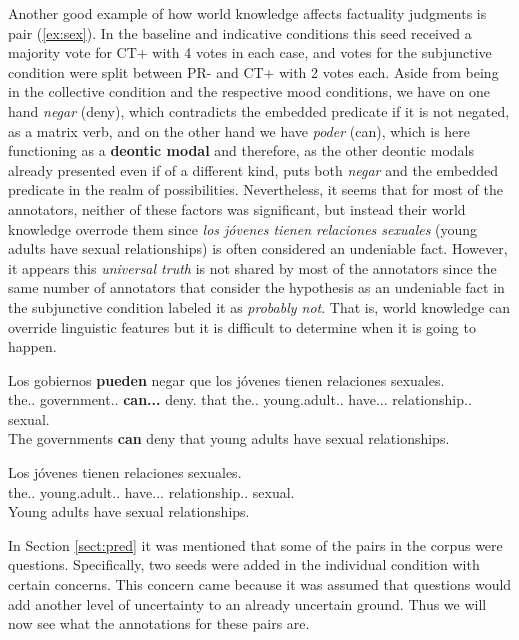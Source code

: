 Another good example of how world knowledge affects factuality judgments is pair (\ref{ex:sex}). In the baseline and indicative conditions this seed received a majority vote for CT+ with 4 votes in each case, and votes for the subjunctive condition were split between PR- and CT+ with 2 votes each. Aside from being in the collective condition and the respective mood conditions, we have on one hand \textit{negar} (deny), which contradicts the embedded predicate if it is not negated, as a matrix verb, and on the other hand we have \textit{poder} (can), which is here functioning as a \textbf{deontic modal} and therefore, as the other deontic modals already presented even if of a different kind, puts both \textit{negar} and the embedded predicate in the realm of possibilities. Nevertheless, it seems that for most of the annotators, neither of these factors was significant, but instead their world knowledge overrode them since \textit{los jóvenes tienen relaciones sexuales} (young adults have sexual relationships) is often considered an undeniable fact. However, it appears this \textit{universal truth} is not shared by most of the annotators since the same number of annotators that consider the hypothesis as an undeniable fact in the subjunctive condition labeled it as \textit{probably not}. That is, world knowledge can override linguistic features but it is difficult to determine when it is going to happen.\\

\begin{exe}
  \ex\label{ex:sex}
    \begin{xlist}
      \item{\gll Los gobiernos \textbf{pueden} negar que los jóvenes tienen relaciones sexuales.\\ the.\M.\Pl{} government.\M.\Pl{} \textbf{can.\Prs.\Ind.\Tpl{}} deny.\Inf{} that the.\M.\Pl{} young.adult.\M.\Pl{} have.\Prs.\Ind.\Tpl{} relationship.\F.\Pl{} sexual.\Pl{} \\\glt The governments \textbf{can} deny that young adults have sexual relationships.}
      \item{\gll Los jóvenes tienen relaciones sexuales.\\ the.\M.\Pl{} young.adult.\M.\Pl{} have.\Prs.\Ind.\Tpl{} relationship.\F.\Pl{} sexual.\Pl{} \\\glt Young adults have sexual relationships.} \label{ex:hypsex}
    \end{xlist}
\end{exe}

In Section \ref{sect:pred} it was mentioned that some of the pairs in the corpus were questions. Specifically, two seeds were added in the individual condition with certain concerns. This concern came because it was assumed that questions would add another level of uncertainty to an already uncertain ground. Thus we will now see what the annotations for these pairs are.\\ 

